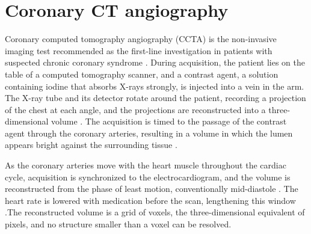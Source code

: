 
\section{Coronary CT angiography}
\label{sec:ccta}

Coronary computed tomography angiography (CCTA) is the non-invasive imaging test recommended as the first-line investigation in patients with suspected chronic coronary syndrome \cite{knuuti2019esc}.
During acquisition, the patient lies on the table of a computed tomography scanner, and a contrast agent, a solution containing iodine that absorbs X-rays strongly, is injected into a vein in the arm.
The X-ray tube and its detector rotate around the patient, recording a projection of the chest at each angle, and the projections are reconstructed into a three-dimensional volume \cite{abbara2016scct}.
The acquisition is timed to the passage of the contrast agent through the coronary arteries, resulting in a volume in which the lumen appears bright against the surrounding tissue \cite{abbara2016scct}.

As the coronary arteries move with the heart muscle throughout the cardiac cycle, acquisition is synchronized to the electrocardiogram, and the volume is reconstructed from the phase of least motion, conventionally mid-diastole \cite{abbara2016scct}.
The heart rate is lowered with medication before the scan, lengthening this window \cite{abbara2016scct}.The reconstructed volume is a grid of voxels, the three-dimensional equivalent of pixels, and no structure smaller than a voxel can be resolved.